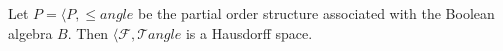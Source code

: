 Let $P = \langle P, \leq 
angle$ be the partial order structure associated with the Boolean algebra $B$. Then $\langle \mathcal{F}, \mathcal{T} 
angle$ is a Hausdorff space.
